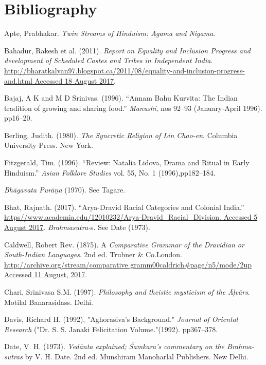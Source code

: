 \section*{Bibliography}

\begin{thebibliography}{99}
 Apte, Prabhakar. \textit{Twin Streams of Hinduism: Agama and Nigama}.

  Bahadur, Rakesh et al. (2011). \textit{Report on Equality and Inclusion Progress and development of Scheduled Castes and Tribes in Independent India}. \url{http://bharatkalyan97.blogspot.ca/2011/08/equality-and-inclusion-progress-and.html Accessed 18 August 2017}.

  Bajaj, A K and M D Srinivas. (1996). “Annam Bahu Kurvita: The Indian tradition of growing and sharing food.” \textit{Manushi}, nos 92–93 (January-April 1996). pp16–20.

  Berling, Judith. (1980). \textit{The Syncretic Religion of Lin Chao-en}. Columbia University Press. New York.

  Fitzgerald, Tim. (1996). “Review: Natalia Lidova, Drama and Ritual in Early Hinduism.” \textit{Asian Folklore Studies} vol. 55, No. 1 (1996),\break pp182–184.

  \textit{Bhāgavata Purāṇa} (1970). See Tagare.

  Bhat, Rajnath. (2017). “Arya-Dravid Racial Categories and Colonial India.” \url{https//www.academia.edu/12010232/Arya-Dravid_Racial_Division. Accessed 5 August 2017}. \textit{Brahmasutra-}s. See Date (1973).

  Caldwell, Robert Rev. (1875). A \textit{Comparative Grammar of the Dravidian or South-Indian Languages}. 2nd ed. Trubner \& Co.London. \url{http://archive.org/stream/comparative gramm00caldrich#page/n5/mode/2up Accessed 11 August, 2017}.

  Chari, Srinivasa S.M. (1997). \textit{Philosophy and theistic mysticism of the Āļvārs}. Motilal Banarasidass. Delhi.

  Davis, Richard H. (1992), "Aghorasiva's Background." \textit{Journal of Oriental Research} ("Dr. S. S. Janaki Felicitation Volume."(1992). pp367–378.

  Date, V. H. (1973). \textit{Vedānta explained; Śamkara’s commentary on the Brahma-sūtras} by V. H. Date. 2nd ed. Munshiram Manoharlal Publishers. New Delhi.


\end{thebibliography}
